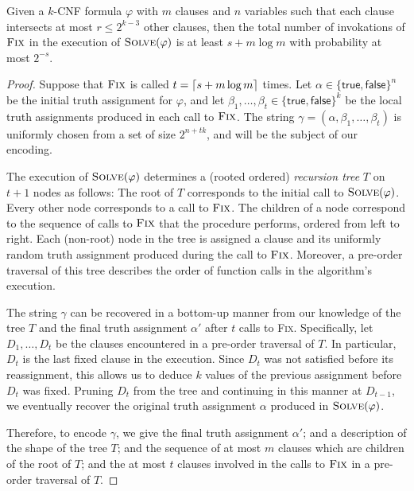 \documentclass{patmorin}
\begin{document}
\begin{thm}
%
  Given a $k$-CNF formula $\varphi$ with $m$ clauses and $n$ variables
  such that each clause intersects at most $r \le 2^{k - 3}$ other
  clauses, then the total number of invokations of $\textsc{Fix}$ in
  the execution of $\textsc{Solve}(\varphi)$ is at least
  $s + m \log m$ with probability at most $2^{-s}$.
\end{thm}
\begin{proof}
  Suppose that $\textsc{Fix}$ is called 
  $t = {\lceil s + m\log m \rceil}$ times. Let
  $\alpha \in \{\textsf{true}, \textsf{false}\}^n$ be the initial
  truth assignment for $\varphi$, and let
  $\beta_1, \ldots, \beta_t \in \{\textsf{true}, \textsf{false}\}^k$
  be the local truth assignments produced in each call to
  $\textsc{Fix}$. The string
  $\gamma = (\alpha, \beta_1, \ldots, \beta_t)$ is uniformly chosen
  from a set of size $2^{n + tk}$, and will be the subject of our
  encoding.

  The execution of $\textsc{Solve}(\varphi)$ determines a (rooted
  ordered) \emph{recursion tree} $T$ on $t + 1$ nodes as follows: The
  root of $T$ corresponds to the initial call to
  $\textsc{Solve}(\varphi)$. Every other node corresponds to a call
  to $\textsc{Fix}$. The children of a node correspond 
   to the sequence of calls to $\textsc{Fix}$ that the procedure
  performs, ordered from left to right.
  Each (non-root) node in the tree is assigned a clause
  and its uniformly random truth assignment produced during the call
  to $\textsc{Fix}$. Moreover, a pre-order traversal of this tree
  describes the order of function calls in the algorithm's execution.

  The string $\gamma$ can be recovered in a bottom-up manner from our
  knowledge of the tree $T$ and the final truth assignment
  $\alpha'$ after $t$ calls to \textsc{Fix}. 
  Specifically, let $D_1, \dots, D_t$ be the clauses
  encountered in a pre-order traversal of $T$. In particular, $D_t$ is
  the last fixed clause in the execution. Since $D_t$ was not
  satisfied before its reassignment, this allows us to deduce $k$
  values of the previous assignment
  before $D_t$ was fixed. Pruning $D_t$ from the tree and continuing
  in this manner at $D_{t - 1}$, we eventually recover the original
  truth assignment $\alpha$ produced in $\textsc{Solve}(\varphi)$.

  Therefore, to encode $\gamma$, we give the final truth
  assignment $\alpha'$; and a description of the shape of the tree
  $T$; and the sequence of at most $m$ clauses which are children of
  the root of $T$; and the at most $t$ clauses involved in the calls
  to $\textsc{Fix}$ in a pre-order traversal of $T$.  


\end{proof}
\end{document}
